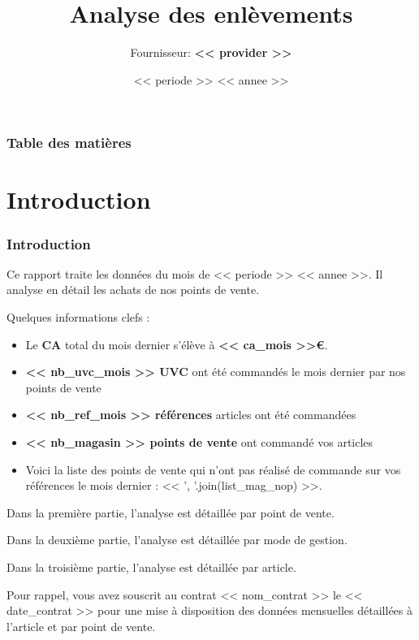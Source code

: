 \documentclass{beamer}
\title{Analyse des enlèvements}
\author{Fournisseur: \textbf{<< provider >>}}
\date{<< periode >> << annee >>}
\begin{document}
    \begin{frame}
        \titlepage
    \end{frame}

    \begin{frame}
        \frametitle{Table des matières}
        \tableofcontents
    \end{frame}

    \section{Introduction}

    \begin{frame}
        \tiny
        \frametitle{Introduction}
        Ce rapport traite les données du mois de << periode >> << annee >>. Il analyse en détail les achats de nos points de vente.\par

        Quelques informations clefs :

        \begin{itemize}
            \item{Le \textbf{CA} total du mois dernier s’élève à \textbf{<< ca_mois >>€}.}
            \item{\textbf{<< nb_uvc_mois >> UVC} ont été commandés le mois dernier par nos points de vente}
            \item{\textbf{<< nb_ref_mois >> références} articles ont été commandées}
            \item{\textbf{<< nb_magasin >> points de vente} ont commandé vos articles}
            \item{Voici la liste des points de vente qui n’ont pas réalisé de commande sur vos références le mois dernier : << ', '.join(list_mag_nop) >>.}
        \end{itemize}

        Dans la première partie, l’analyse est détaillée par point de vente.\par
        Dans la deuxième partie, l’analyse est détaillée par mode de gestion.\par
        Dans la troisième partie, l’analyse est détaillée par article.\par
        Pour rappel, vous avez souscrit au contrat << nom_contrat >> le << date_contrat >> pour une mise à disposition des données mensuelles détaillées à l’article et par point de vente.\par
    \end{frame}
\end{document}

